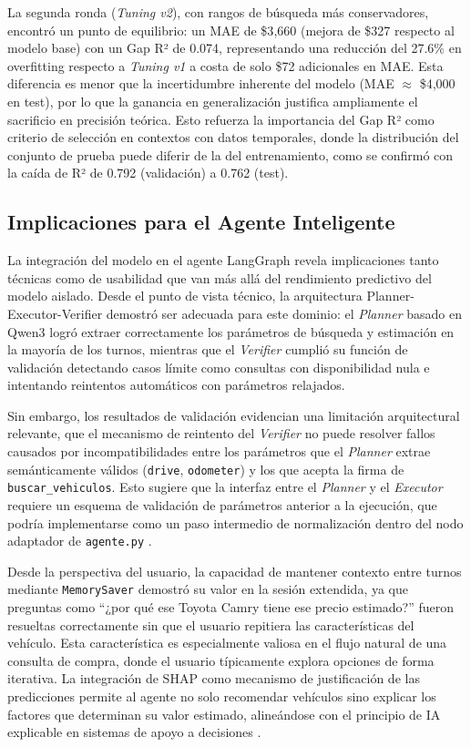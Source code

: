 \documentclass[conference]{IEEEtran}
\begin{document}
La segunda ronda (\textit{Tuning v2}), con rangos de búsqueda más conservadores, encontró un punto de equilibrio: un MAE de \$3{,}660 (mejora de \$327 respecto al modelo base) con un Gap R² de 0.074, representando una reducción del 27.6\% en overfitting respecto a \textit{Tuning v1} a costa de solo \$72 adicionales en MAE. Esta diferencia es menor que la incertidumbre inherente del modelo (MAE $\approx$ \$4{,}000 en test), por lo que la ganancia en generalización justifica ampliamente el sacrificio en precisión teórica. Esto refuerza la importancia del Gap R² como criterio de selección en contextos con datos temporales, donde la distribución del conjunto de prueba puede diferir de la del entrenamiento, como se confirmó con la caída de R² de 0.792 (validación) a 0.762 (test).

\subsection{Implicaciones para el Agente Inteligente}
\label{subsec:disc_agente}
La integración del modelo en el agente LangGraph revela implicaciones tanto técnicas como de usabilidad que van más allá del rendimiento predictivo del modelo aislado. Desde el punto de vista técnico, la arquitectura Planner-Executor-Verifier demostró ser adecuada para este dominio: el \textit{Planner} basado en Qwen3 logró extraer correctamente los parámetros de búsqueda y estimación en la mayoría de los turnos, mientras que el \textit{Verifier} cumplió su función de validación detectando casos límite como consultas con disponibilidad nula e intentando reintentos automáticos con parámetros relajados.

Sin embargo, los resultados de validación evidencian una limitación arquitectural relevante, que el mecanismo de reintento del \textit{Verifier} no puede resolver fallos causados por incompatibilidades entre los parámetros que el \textit{Planner} extrae semánticamente válidos (\texttt{drive}, \texttt{odometer}) y los que acepta la firma de \texttt{buscar\_vehiculos}. Esto sugiere que la interfaz entre el \textit{Planner} y el \textit{Executor} requiere un esquema de validación de parámetros anterior a la ejecución, que podría implementarse como un paso intermedio de normalización dentro del nodo adaptador de \texttt{agente.py} \cite{dong2025, rosario2025}.

Desde la perspectiva del usuario, la capacidad de mantener contexto entre turnos mediante \texttt{MemorySaver} demostró su valor en la sesión extendida, ya que preguntas como ``¿por qué ese Toyota Camry tiene ese precio estimado?'' fueron resueltas correctamente sin que el usuario repitiera las características del vehículo. Esta característica es especialmente valiosa en el flujo natural de una consulta de compra, donde el usuario típicamente explora opciones de forma iterativa. La integración de SHAP como mecanismo de justificación de las predicciones permite al agente no solo recomendar vehículos sino explicar los factores que determinan su valor estimado, alineándose con el principio de IA explicable en sistemas de apoyo a decisiones \cite{masterman2024}.
\end{document}
